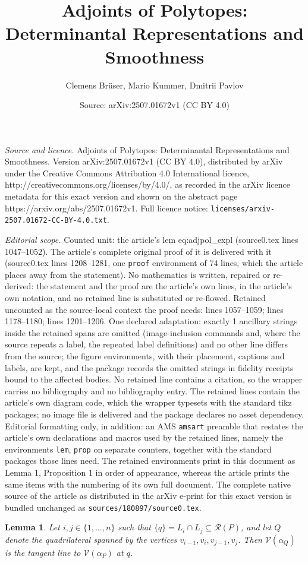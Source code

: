 \documentclass[10pt,a4paper]{amsart}
\title{Adjoints of Polytopes: Determinantal Representations and Smoothness}
\author{Clemens Br\"user, Mario Kummer, Dmitrii Pavlov}
\date{Source: arXiv:2507.01672v1 (CC BY 4.0)}
\newtheorem{lem}{Lemma}
\newcommand{\cR}{{\mathcal R}}
\newcommand{\cV}{{\mathcal V}}
\begin{document}
\maketitle

\noindent\emph{Source and licence.} Adjoints of Polytopes: Determinantal Representations and Smoothness. Version arXiv:2507.01672v1 (CC BY 4.0), distributed by arXiv under the Creative Commons Attribution 4.0 International licence, http://creativecommons.org/licenses/by/4.0/, as recorded in the arXiv licence metadata for this exact version and shown on the abstract page https://arxiv.org/abs/2507.01672v1. Full licence notice: \texttt{licenses/arxiv-2507.01672-CC-BY-4.0.txt}.\par\smallskip

\noindent\textit{Editorial scope.} Counted unit: the article's lem eq:adjpol\_expl (source0.tex lines 1047--1052). The article's complete original proof of it is delivered with it (source0.tex lines 1208--1281, one \texttt{proof} environment of 74 lines, which the article places away from the statement). No mathematics is written, repaired or re-derived: the statement and the proof are the article's own lines, in the article's own notation, and no retained line is substituted or re-flowed.  Retained uncounted as the source-local context the proof needs: lines 1057--1059; lines 1178--1180; lines 1201--1206.  One declared adaptation: exactly 1 ancillary strings inside the retained spans are omitted (image-inclusion commands and, where the source repeats a label, the repeated label definitions) and no other line differs from the source; the figure environments, with their placement, captions and labels, are kept, and the package records the omitted strings in fidelity receipts bound to the affected bodies.  No retained line contains a citation, so the wrapper carries no bibliography and no bibliography entry.  The retained lines contain the article's own diagram code, which the wrapper typesets with the standard tikz packages; no image file is delivered and the package declares no asset dependency.  Editorial formatting only, in addition: an AMS \texttt{amsart} preamble that restates the article's own declarations and macros used by the retained lines, namely the environments \texttt{lem}, \texttt{prop} on separate counters, together with the standard packages those lines need.  The retained environments print in this document as Lemma 1, Proposition 1 in order of appearance, whereas the article prints the same items with the numbering of its own full document.  The complete native source of the article as distributed in the arXiv e-print for this exact version is bundled unchanged as \texttt{sources/180897/source0.tex}.
\begin{lem} \label{lem:AdjTangent}
    Let $i,j\in\{1,\ldots,n\}$ such that $\{q\} = L_i \cap L_j\subseteq\cR(P)$, and let $Q$ denote the quadrilateral spanned by the vertices $v_{i-1}, v_i, v_{j-1}, v_j$. Then $\cV(\alpha_{Q})$ is the tangent line to $\cV(\alpha_P)$ at $q$.
\end{lem}
\end{document}
